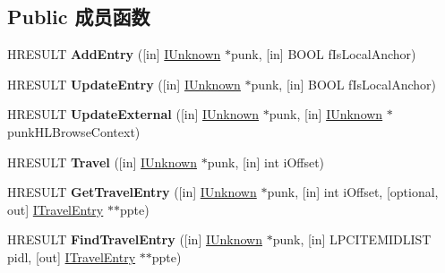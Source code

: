 \subsection*{Public 成员函数}
\begin{DoxyCompactItemize}
\item 
\mbox{\label{interface_i_travel_log_ae19889b21d9c374f205b992959eaf0b1}} 
H\+R\+E\+S\+U\+LT {\bfseries Add\+Entry} (\mbox{[}in\mbox{]} \hyperlink{interface_i_unknown}{I\+Unknown} $\ast$punk, \mbox{[}in\mbox{]} B\+O\+OL f\+Is\+Local\+Anchor)
\item 
\mbox{\label{interface_i_travel_log_a86e30243bb1ab9ae4547eb44e886e1e5}} 
H\+R\+E\+S\+U\+LT {\bfseries Update\+Entry} (\mbox{[}in\mbox{]} \hyperlink{interface_i_unknown}{I\+Unknown} $\ast$punk, \mbox{[}in\mbox{]} B\+O\+OL f\+Is\+Local\+Anchor)
\item 
\mbox{\label{interface_i_travel_log_a96af7304bc173fad5a0d3e834416493a}} 
H\+R\+E\+S\+U\+LT {\bfseries Update\+External} (\mbox{[}in\mbox{]} \hyperlink{interface_i_unknown}{I\+Unknown} $\ast$punk, \mbox{[}in\mbox{]} \hyperlink{interface_i_unknown}{I\+Unknown} $\ast$punk\+H\+L\+Browse\+Context)
\item 
\mbox{\label{interface_i_travel_log_ac10806df862f59bf731a2326be26071d}} 
H\+R\+E\+S\+U\+LT {\bfseries Travel} (\mbox{[}in\mbox{]} \hyperlink{interface_i_unknown}{I\+Unknown} $\ast$punk, \mbox{[}in\mbox{]} int i\+Offset)
\item 
\mbox{\label{interface_i_travel_log_a0f47fcc50f408093201e20f0df5f0f38}} 
H\+R\+E\+S\+U\+LT {\bfseries Get\+Travel\+Entry} (\mbox{[}in\mbox{]} \hyperlink{interface_i_unknown}{I\+Unknown} $\ast$punk, \mbox{[}in\mbox{]} int i\+Offset, \mbox{[}optional, out\mbox{]} \hyperlink{interface_i_travel_entry}{I\+Travel\+Entry} $\ast$$\ast$ppte)
\item 
\mbox{\label{interface_i_travel_log_ac6daef4b34f4e7e445f6fbb32c1c6464}} 
H\+R\+E\+S\+U\+LT {\bfseries Find\+Travel\+Entry} (\mbox{[}in\mbox{]} \hyperlink{interface_i_unknown}{I\+Unknown} $\ast$punk, \mbox{[}in\mbox{]} L\+P\+C\+I\+T\+E\+M\+I\+D\+L\+I\+ST pidl, \mbox{[}out\mbox{]} \hyperlink{interface_i_travel_entry}{I\+Travel\+Entry} $\ast$$\ast$ppte)

\end{DoxyCompactItemize}
